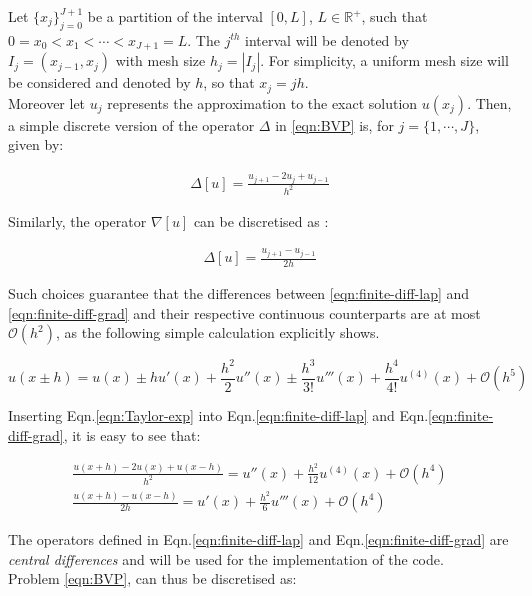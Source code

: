 \documentclass[11pt]{article}
\theoremstyle{theorem}
\theoremstyle{definition}
\begin{document}
Let $\lbrace x_j\rbrace_{j=0}^{J+1}$ be a partition of the interval $[0, L]$, $L\in\mathbb{R}^+$, such that $0=x_0<x_1<\cdots<x_{J+1}=L$. The $j^{th}$ interval will be denoted by $I_j=(x_{j-1}, x_j)$ with mesh size $h_j=|I_j|$. For simplicity, a uniform mesh size will be considered and denoted by $h$, so that $x_j=jh$.\\
Moreover let $u_j$ represents the approximation to the exact solution $u(x_j)$. Then, a simple discrete version of the operator $\Delta$ in \eqref{eqn:BVP} is, for $j=\lbrace 1, \cdots, J\rbrace$, given by:

\begin{align}
	\label{eqn:finite-diff-lap}
	\Delta[u]=\frac{u_{j+1}-2u_j+u_{j-1}}{h^2}
\end{align}

Similarly, the operator $\nabla [u]$ can be discretised as :

\begin{align}
\label{eqn:finite-diff-grad}
\Delta[u]=\frac{u_{j+1}-u_{j-1}}{2h}
\end{align}

Such choices guarantee that the differences between \eqref{eqn:finite-diff-lap} and \eqref{eqn:finite-diff-grad} and their respective continuous counterparts are at most $\mathcal{O}(h^2)$, as the following simple calculation explicitly shows. 

\begin{equation}\label{eqn:Taylor-exp}
u(x\pm h)=u(x)\pm hu'(x)+\frac{h^2}{2}u''(x)\pm \frac{h^3}{3!}u'''(x)+\frac{h^4}{4!}u^{(4)}(x)+\mathcal{O}(h^5)
\end{equation}

Inserting Eqn.\eqref{eqn:Taylor-exp} into Eqn.\eqref{eqn:finite-diff-lap} and Eqn.\eqref{eqn:finite-diff-grad}, it is easy to see that:

\begin{align}
	\label{eqn:order-consistency}
	\frac{u(x+h)-2u(x)+u(x-h)}{h^2}=u''(x)+\frac{h^2}{12}u^{(4)}(x)+\mathcal{O}(h^4)\\
	\frac{u(x+h)-u(x-h)}{2h}=u'(x)+\frac{h^2}{6}u'''(x)+\mathcal{O}(h^4)
\end{align}

The operators defined in Eqn.\eqref{eqn:finite-diff-lap} and Eqn.\eqref{eqn:finite-diff-grad} are \emph{central differences} and will be used for the implementation of the code.\\

Problem \eqref{eqn:BVP}, can thus be discretised as:
\end{document}
